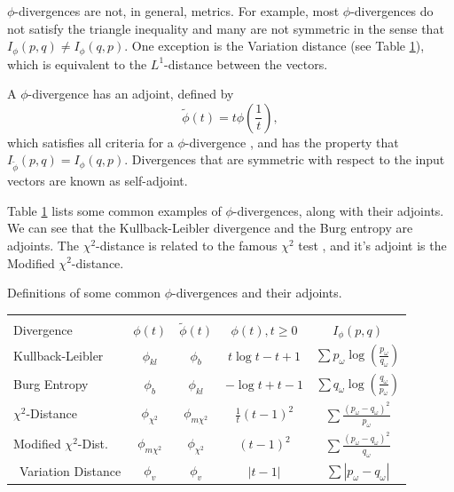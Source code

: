 \documentclass[opre,nonblindrev]{informs3} %
\begin{document}
$\phi$-divergences are not, in general, metrics.
For example, most $\phi$-divergences do not satisfy the triangle inequality and many are not symmetric in the sense that $I_\phi(p,q) \neq I_\phi(q,p)$.
One exception is the Variation distance (see Table \ref{tb:phi_definitions}), which is equivalent to the $L^1$-distance between the vectors.

A $\phi$-divergence has an adjoint, defined by
\begin{equation} \label{eq:adjoint}
	\tilde{\phi}(t) = t \phi\left(\frac{1}{t}\right),
\end{equation}
which satisfies all criteria for a $\phi$-divergence \citep{bental1991certainty}, and has the property that $I_{\tilde{\phi}}(p,q) = I_\phi(q,p)$.
Divergences that are symmetric with respect to the input vectors are known as self-adjoint.

Table \ref{tb:phi_definitions} lists some common examples of $\phi$-divergences, along with their adjoints.
We can see that the Kullback-Leibler divergence and the Burg entropy are adjoints.
The $\chi^2$-distance is related to the famous $\chi^2$ test \citep{pardo2005statistical}, and it's adjoint is the Modified $\chi^2$-distance.

\begin{table}
	\TABLE
	{
		Definitions of some common $\phi$-divergences and their adjoints.
		\label{tb:phi_definitions}
	}
	{\begin{tabular}{lcccc}
		\hline \\
		Divergence                        & $\phi(t)$          & $\tilde{\phi}(t)$               & $\phi(t), t \geq 0$   & $I_\phi(p,q)$ \\
		\hline
		Kullback-Leibler                 & $\phi_{kl}$        & $\phi_b$                        & $t\log t - t + 1$     & $\sum p_\omega \log\left(\frac{p_\omega}{q_\omega}\right)$ \\
		Burg Entropy                      & $\phi_b$           & $\phi_{kl}$                     & $-\log t + t - 1$     & $\sum q_\omega \log\left(\frac{q_\omega}{p_\omega}\right)$ \\
		$\chi^2$-Distance                 & $\phi_{\chi^2}$    & $\phi_{m\chi^2}$                & $\frac{1}{t} (t-1)^2$ & $\sum \frac{(p_\omega-q_\omega)^2}{p_\omega}$ \\
		Modified $\chi^2$-Dist.           & $\phi_{m\chi^2}$   & $\phi_{\chi^2}$                 & $(t-1)^2$             & $\sum \frac{(p_\omega - q_\omega)^2}{q_\omega}$ \\\
		Variation Distance                & $\phi_v$           & $\phi_v$                        & $|t-1|$               & $\sum |p_\omega - q_\omega|$ \\
	\hline
	\end{tabular}}
	{}
\end{table}
\end{document}

